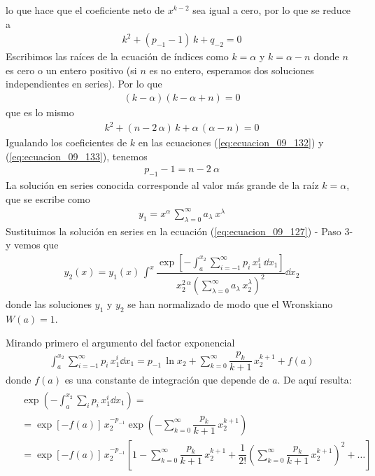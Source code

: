 lo que hace que el coeficiente neto de $x^{k-2}$ sea igual a cero, por lo que se reduce a
\begin{align}
k^{2} + (p_{-1} - 1) \, k + q_{-2} = 0
\label{eq:ecuacion_09_132}
\end{align}
Escribimos las raíces de la ecuación de índices como $k = \alpha$ y $k= \alpha - n$ donde $n$ es cero o un entero positivo (si $n$ es no entero, esperamos dos soluciones independientes en series). Por lo que
\begin{align}
(k - \alpha)(k - \alpha + n) = 0
\label{eq:ecuacion_09_133}
\end{align}
que es lo mismo
\begin{align*}
k^{2} + (n - 2 \, \alpha) \, k + \alpha \, (\alpha - n) = 0
\end{align*}
Igualando los coeficientes de $k$ en las ecuaciones (\ref{eq:ecuacion_09_132}) y (\ref{eq:ecuacion_09_133}), tenemos
\begin{align}
p_{-1} -1 = n - 2 \: \alpha
\label{eq:ecuacion_09_134}
\end{align}
La solución en series conocida corresponde al valor más grande de la raíz $k = \alpha$, que se escribe como
\begin{align*}
y_{1} =  x^{\alpha} \, \sum_{\lambda=0}^{\infty} a_{\lambda} \: x^{\lambda}
\end{align*}
Sustituimos la solución en series en la ecuación (\ref{eq:ecuacion_09_127}) - Paso 3- y vemos que
\begin{align}
y_{2}(x) = y_{1} (x) \, \int^{x} \dfrac{\exp \left[ \displaystyle - \int_{a}^{x_{2}} \sum_{i=-1}^{\infty} p_{i} \, x^{i}_{1} \, \dd{x_{1}} \right] }{x_{2}^{2 \, \alpha} \left( \displaystyle \sum_{\lambda=0}^\infty a_{\lambda} \, x_{2}^{\lambda} \right)^{2} } \dd{x_{2}}
\label{eq:ecuacion_09_135}
\end{align}
donde las soluciones $y_{1}$ y $y_{2}$ se han normalizado de modo que el Wronskiano $W(a) = 1$. 
\par
Mirando primero el argumento del factor exponencial
\begin{align}
\int_{a}^{x_{2}} \sum_{i=-1}^{\infty} p_{i} \, x_{1}^{i} \dd{x_{1}} = p_{-1} \, \ln x_{2} + \sum_{k=0}^{\infty} \dfrac{p_{k}}{k + 1} \, x_{2}^{k + 1} + f(a)
\label{eq:ecuacion_09_136}
\end{align}
donde $f(a)$ es una constante de integración que depende de $a$. De aquí resulta:
\begin{align}
\begin{aligned}
&{}\exp \left( - \int_{a}^{x_{2}} \sum_{i} p_{i} \, x_{1}^{i} \dd{x_{1}} \right) =  \\
&= \exp [ - f(a) ] \, x_{2}^{-p_{-1}} \exp \left( - \sum_{k=0}^{\infty} \dfrac{p_{k}}{k+1} \, x_{2}^{k+1} \right)  \\
&= \exp [ - f(a) ] \, x_{2}^{-p_{-1}} \left[ 1 - \sum_{k=0}^{\infty} \dfrac{p_{k}}{k+1} \, x_{2}^{k+1} + \dfrac{1}{2!} \left( \sum_{k=0}^{\infty} \dfrac{p_{k}}{k+1} \, x_{2}^{k+1} \right)^{2} + \ldots \right]
\end{aligned}
\label{eq:ecuacion_09_137}
\end{align}

